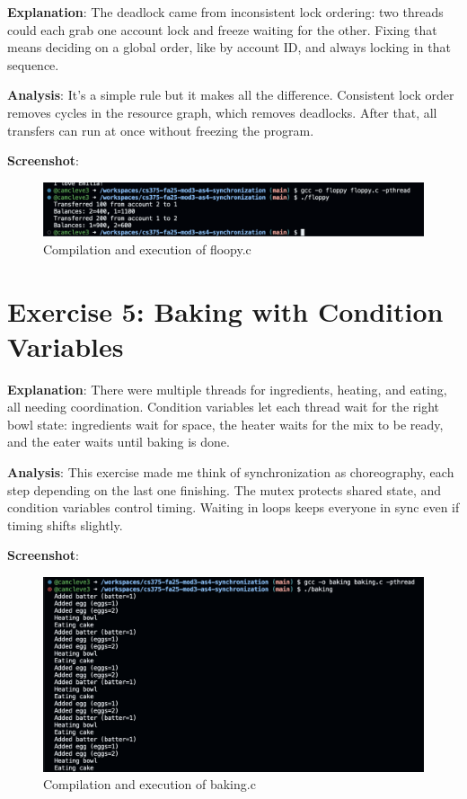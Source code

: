 \documentclass{article}
\begin{document}
\textbf{Explanation}:  
The deadlock came from inconsistent lock ordering: two threads could each grab one account lock and freeze waiting for the other. Fixing that means deciding on a global order, like by account ID, and always locking in that sequence.

\textbf{Analysis}:  
It’s a simple rule but it makes all the difference. Consistent lock order removes cycles in the resource graph, which removes deadlocks. After that, all transfers can run at once without freezing the program.

\textbf{Screenshot}:
\begin{figure}[h]
  \centering
  \includegraphics[width=\textwidth]{pic4.png}
  \caption{Compilation and execution of floopy.c}
\end{figure}

\section{Exercise 5: Baking with Condition Variables}


\textbf{Explanation}:  
There were multiple threads for ingredients, heating, and eating, all needing coordination. Condition variables let each thread wait for the right bowl state: ingredients wait for space, the heater waits for the mix to be ready, and the eater waits until baking is done.

\textbf{Analysis}:  
This exercise made me think of synchronization as choreography, each step depending on the last one finishing. The mutex protects shared state, and condition variables control timing. Waiting in loops keeps everyone in sync even if timing shifts slightly.

\textbf{Screenshot}:
\begin{figure}[h]
  \centering
  \includegraphics[width=\textwidth]{pic5.png}
  \caption{Compilation and execution of baking.c}
\end{figure}
\end{document}

